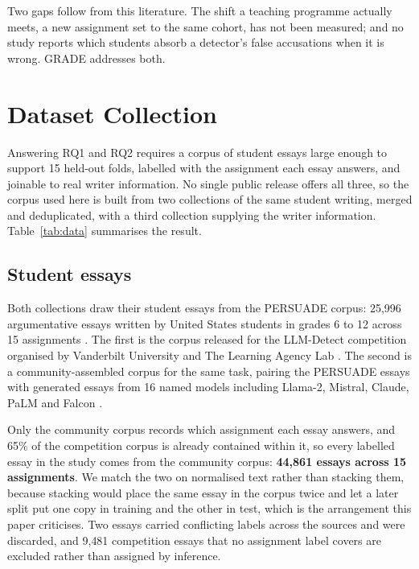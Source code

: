 \documentclass[11pt,a4paper]{article}
\begin{document}
Two gaps follow from this literature. The shift a teaching programme
actually meets, a new assignment set to the same cohort, has not been
measured; and no study reports which students absorb a detector's false
accusations when it is wrong. GRADE addresses both.

\section{Dataset Collection}

Answering RQ1 and RQ2 requires a corpus of student essays large enough to
support 15 held-out folds, labelled with the assignment each essay answers,
and joinable to real writer information. No single public release offers
all three, so the corpus used here is built from two collections of the
same student writing, merged and deduplicated, with a third collection
supplying the writer information. Table~\ref{tab:data} summarises the
result.

\subsection{Student essays}

Both collections draw their student essays from the PERSUADE corpus:
25{,}996 argumentative essays written by United States students in grades 6
to 12 across 15 assignments \cite{crossley2024}. The first is the corpus
released for the LLM-Detect competition organised by Vanderbilt University
and The Learning Agency Lab \cite{king2023}. The second is a
community-assembled corpus for the same task, pairing the PERSUADE essays
with generated essays from 16 named models including Llama-2, Mistral,
Claude, PaLM and Falcon \cite{daigt2024}.

Only the community corpus records which assignment each essay answers, and
65\% of the competition corpus is already contained within it, so every
labelled essay in the study comes from the community corpus:
\textbf{44{,}861 essays across 15 assignments}. We match the two on
normalised text rather than stacking them, because stacking would place the
same essay in the corpus twice and let a later split put one copy in
training and the other in test, which is the arrangement this paper
criticises. Two essays carried conflicting labels across the sources and
were discarded, and 9{,}481 competition essays that no assignment label
covers are excluded rather than assigned by inference.
\end{document}
